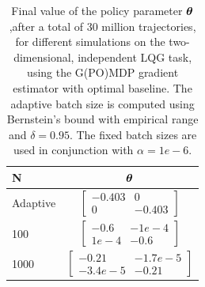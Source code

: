 \begin{table}[h!]\label{tab:4}
\caption{Final value of the policy parameter $\boldsymbol{\theta}$,after a total of 30 million trajectories, for different simulations on the two-dimensional, independent \ac{LQG} task, using the G(PO)MDP gradient estimator with optimal baseline. The adaptive batch size is computed using Bernstein's bound with empirical range and $\delta=0.95$. The fixed batch sizes are used in conjunction with $\alpha=1e-6$.}
\centering
\begin{adjustbox}{center}
\begin{tabular}{@{}lc@{}} 
\toprule
N & $\boldsymbol{\theta}$ \\
\midrule
Adaptive & $\begin{bmatrix}
	-0.403 & 0 		\\
	0		 & -0.403
	\end{bmatrix}$\\
100 & $\begin{bmatrix}
	-0.6 & -1e-4 		\\
	1e-4		 & -0.6
	\end{bmatrix}$\\
1000 & $\begin{bmatrix}
	-0.21 & -1.7e-5 		\\
	-3.4e-5		 & -0.21
	\end{bmatrix}$\\
\bottomrule
\end{tabular}
\end{adjustbox}
\end{table}